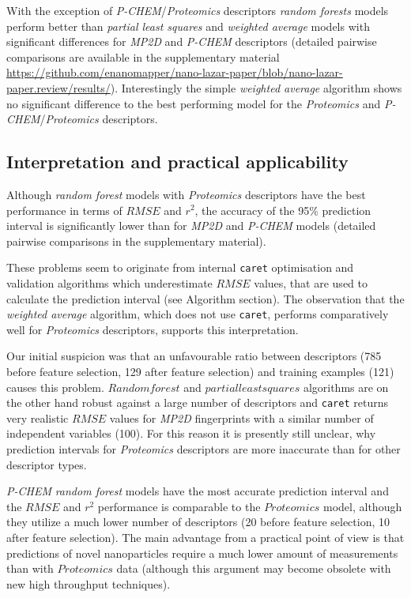 \documentclass[utf8]{frontiersHLTH} %
\begin{document}
With the exception of \emph{P-CHEM}/\emph{Proteomics} descriptors
\emph{random forests} models perform better than \emph{partial least
squares} and \emph{weighted average} models with significant differences
for \emph{MP2D} and \emph{P-CHEM} descriptors (detailed pairwise
comparisons are available in the supplementary material
\url{https://github.com/enanomapper/nano-lazar-paper/blob/nano-lazar-paper.review/results/}).
Interestingly the simple \emph{weighted average} algorithm shows no
significant difference to the best performing model for the
\emph{Proteomics} and \emph{P-CHEM}/\emph{Proteomics} descriptors.

\subsection{Interpretation and practical
applicability}\label{interpretation-and-practical-applicability}

Although \emph{random forest} models with \emph{Proteomics} descriptors
have the best performance in terms of \(RMSE\) and \(r^2\), the accuracy
of the 95\% prediction interval is significantly lower than for
\emph{MP2D} and \emph{P-CHEM} models (detailed pairwise comparisons in
the supplementary material).

These problems seem to originate from internal \texttt{caret}
optimisation and validation algorithms which underestimate \(RMSE\)
values, that are used to calculate the prediction interval (see
Algorithm section). The observation that the \emph{weighted average}
algorithm, which does not use \texttt{caret}, performs comparatively
well for \emph{Proteomics} descriptors, supports this interpretation.

Our initial suspicion was that an unfavourable ratio between descriptors
(785 before feature selection, 129 after feature selection) and training
examples (121) causes this problem. \(Random forest\) and
\(partial least squares\) algorithms are on the other hand robust
against a large number of descriptors and \texttt{caret} returns very
realistic \(RMSE\) values for \emph{MP2D} fingerprints with a similar
number of independent variables (100). For this reason it is presently
still unclear, why prediction intervals for \emph{Proteomics}
descriptors are more inaccurate than for other descriptor types.

\emph{P-CHEM} \emph{random forest} models have the most accurate
prediction interval and the \(RMSE\) and \(r^2\) performance is
comparable to the \(Proteomics\) model, although they utilize a much
lower number of descriptors (20 before feature selection, 10 after
feature selection). The main advantage from a practical point of view is
that predictions of novel nanoparticles require a much lower amount of
measurements than with \(Proteomics\) data (although this argument may
become obsolete with new high throughput techniques).
\end{document}
